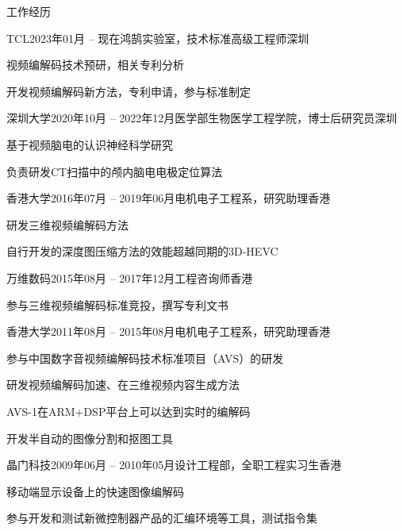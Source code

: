 \documentclass{resume} %
\begin{document}
\begin{rSection}{工作经历}
    \begin{rSubsection}{TCL}{2023年01月 -- 现在}{鸿鹄实验室，技术标准高级工程师}{深圳}
        \item 视频编解码技术预研，相关专利分析
		\item 开发视频编解码新方法，专利申请，参与标准制定
    \end{rSubsection}

    \begin{rSubsection}{深圳大学}{2020年10月 -- 2022年12月}{医学部生物医学工程学院，博士后研究员}{深圳}
        \item 基于视频脑电的认识神经科学研究
        \item 负责研发CT扫描中的颅内脑电电极定位算法
    \end{rSubsection}

	\begin{rSubsection}{香港大学}{2016年07月 -- 2019年06月}{电机电子工程系，研究助理}{香港}
	\item 研发三维视频编解码方法
	\item 自行开发的深度图压缩方法的效能超越同期的3D-HEVC
	\end{rSubsection}

    \begin{rSubsection}{万维数码}{2015年08月 -- 2017年12月}{工程咨询师}{香港}
        \item 参与三维视频编解码标准竞投，撰写专利文书
    \end{rSubsection}

    \begin{rSubsection}{香港大学}{2011年08月 -- 2015年08月}{电机电子工程系，研究助理}{香港}
        \item 参与中国数字音视频编解码技术标准项目（AVS）的研发
        \item 研发视频编解码加速、在三维视频内容生成方法
        \item AVS-1在ARM+DSP平台上可以达到实时的编解码
        \item 开发半自动的图像分割和抠图工具
    \end{rSubsection}

    \begin{rSubsection}{晶门科技}{2009年06月 -- 2010年05月}{设计工程部，全职工程实习生}{香港}
        \item 移动端显示设备上的快速图像编解码
        \item 参与开发和测试新微控制器产品的汇编环境等工具，测试指令集
    \end{rSubsection}
\end{rSection}
\end{document}
